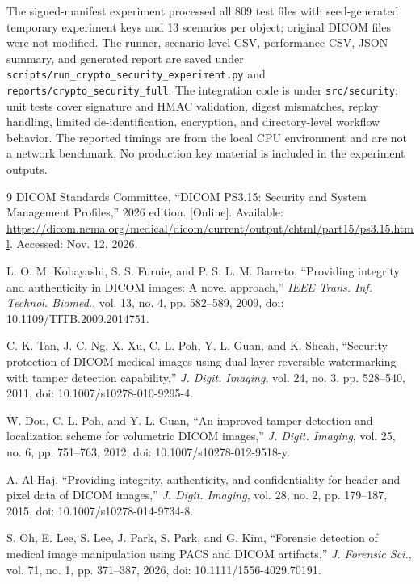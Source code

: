 \documentclass[journal]{IEEEtran}
\begin{document}
  The signed-manifest experiment processed all 809 test files with seed-generated temporary experiment keys and 13 scenarios per object; original DICOM files were not modified. The runner, scenario-level CSV, performance CSV, JSON summary, and generated report are saved under \texttt{scripts/run\_crypto\_security\_experiment.py} and \texttt{reports/crypto\_security\_full}. The integration code is under \texttt{src/security}; unit tests cover signature and HMAC validation, digest mismatches, replay handling, limited de-identification, encryption, and directory-level workflow behavior. The reported timings are from the local CPU environment and are not a network benchmark. No production key material is included in the experiment outputs.

  \begin{thebibliography}{9}
  DICOM Standards Committee, ``DICOM PS3.15: Security and System Management Profiles,'' 2026 edition. [Online]. Available: \url{https://dicom.nema.org/medical/dicom/current/output/chtml/part15/ps3.15.html}. Accessed: Nov. 12, 2026.
  
  L. O. M. Kobayashi, S. S. Furuie, and P. S. L. M. Barreto, ``Providing integrity and authenticity in DICOM images: A novel approach,'' \emph{IEEE Trans. Inf. Technol. Biomed.}, vol. 13, no. 4, pp. 582--589, 2009, doi: 10.1109/TITB.2009.2014751.
  
  C. K. Tan, J. C. Ng, X. Xu, C. L. Poh, Y. L. Guan, and K. Sheah, ``Security protection of DICOM medical images using dual-layer reversible watermarking with tamper detection capability,'' \emph{J. Digit. Imaging}, vol. 24, no. 3, pp. 528--540, 2011, doi: 10.1007/s10278-010-9295-4.
  
  W. Dou, C. L. Poh, and Y. L. Guan, ``An improved tamper detection and localization scheme for volumetric DICOM images,'' \emph{J. Digit. Imaging}, vol. 25, no. 6, pp. 751--763, 2012, doi: 10.1007/s10278-012-9518-y.
  
  A. Al-Haj, ``Providing integrity, authenticity, and confidentiality for header and pixel data of DICOM images,'' \emph{J. Digit. Imaging}, vol. 28, no. 2, pp. 179--187, 2015, doi: 10.1007/s10278-014-9734-8.
  
  S. Oh, E. Lee, S. Lee, J. Park, S. Park, and G. Kim, ``Forensic detection of medical image manipulation using PACS and DICOM artifacts,'' \emph{J. Forensic Sci.}, vol. 71, no. 1, pp. 371--387, 2026, doi: 10.1111/1556-4029.70191.
  

\end{thebibliography}
\end{document}

